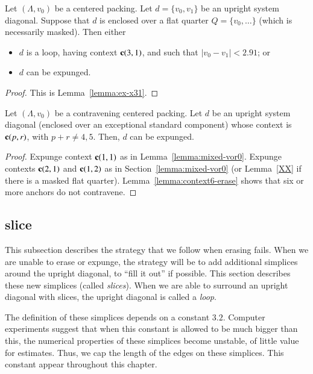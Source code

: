\begin{lemma}
Let $(\Lambda,v_0)$ be a centered packing.  Let $d=\{v_0,v_1\}$ be an upright
system diagonal.  Suppose that $d$ is enclosed over  
a flat quarter $Q=\{v_0,\ldots\}$ (which is necessarily masked).  
Then either
\begin{itemize}
  \item $d$ is a loop, having context ${\operatorname{\bf c}}{(3,1)}$, and such that
    $|v_0-v_1| < 2.91$; or
  \item $d$ can be expunged.
\end{itemize}
\end{lemma}

\begin{proof} This is Lemma~\ref{lemma:ex-x31}.
\end{proof}



\begin{lemma}
Let $(\Lambda,v_0)$ be a contravening centered packing.  Let $d$ be an
upright system diagonal (enclosed over an exceptional standard component)
whose context is ${\operatorname{\bf c}}{(p,r)}$, with $p+r\ne 4,5$.  Then,
$d$ can be expunged.
\end{lemma}

\begin{proof}
Expunge context ${\operatorname{\bf c}}{(1,1)}$ as in Lemma~\ref{lemma:mixed-vor0}.
Expunge contexts ${\operatorname{\bf c}}{(2,1)}$ and ${\operatorname{\bf c}}{(1,2)}$
as in Section~\ref{lemma:mixed-vor0} %
(or Lemma~\ref{XX} %
if there is a masked flat
quarter).  Lemma~\ref{lemma:context6-erase} %
shows that six or more anchors do not contravene.
\end{proof}



\subsection{slice}
\label{sec:slice}  %

This subsection  describes the strategy that
we follow when erasing fails.  
When we are unable to erase or expunge, the strategy will be to
add additional simplices around the upright diagonal, to ``fill it out''
if possible.   This section describes these new simplices (called {\it slices}).
When we are able to surround an upright diagonal with slices, the upright diagonal is called a {\it loop}.  

The definition of these simplices
depends on a constant $3.2$.  Computer experiments  suggest that
when this constant is allowed to be much bigger than this, the
numerical properties of these simplices become unstable, of little
value for estimates.  Thus, we cap the length of the edges on these simplices.
This constant appear throughout this chapter.

